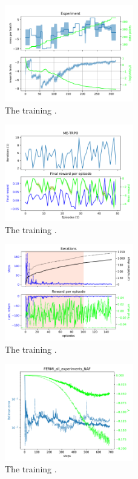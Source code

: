 \documentclass[
 reprint,
 amsmath,amssymb,amsfonts,clevref,
 aps,
prstab,
]{revtex4-2}
\begin{document}
\begin{figure}[!h]
  \centering
  \includegraphics*[width=0.5\textwidth]{Figures/ME-TRPO_observables.pdf}
  \caption{The training .}
  \label{fig:comparsion_per}
\end{figure}
\begin{figure}[!h]
  \centering
  \includegraphics*[width=0.5\textwidth]{Figures/ME-TRPO_verification.pdf}
  \caption{The training .}
  \label{fig:comparsion_per}
\end{figure}

\begin{figure}[!h]
  \centering
  \includegraphics*[width=0.5\textwidth]{Figures/FERMI_all_experiments_NAF_episodes.pdf}
  \caption{The training .}
  \label{fig:comparsion_per}
\end{figure}
\begin{figure}[!h]
  \centering
  \includegraphics*[width=0.5\textwidth]{Figures/FERMI_all_experiments_NAF_convergence.pdf}
  \caption{The training .}
  \label{fig:comparsion_per}
\end{figure}
\end{document}
